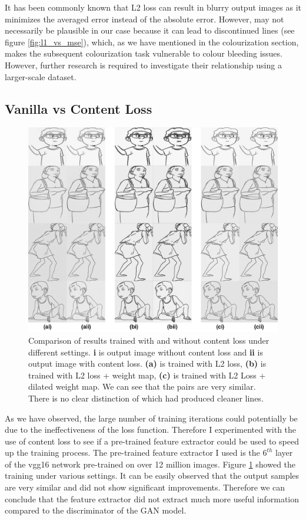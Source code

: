 It has been commonly known that L2 loss can result in blurry output images as it minimizes the averaged error instead of the absolute error\cite{isolaImagetoImageTranslationConditional2018}. However, may not necessarily be plausible in our case because it can lead to discontinued lines (see figure \ref{fig:l1_vs_mse}), which, as we have mentioned in the colourization section, makes the subsequent colourization task vulnerable to colour bleeding issues. However, further research is required to investigate their relationship using a larger-scale dataset.

\subsection{Vanilla vs Content Loss}
\begin{figure}
    \centering
    \includegraphics[width=1.0\textwidth]{images/sketch/content_loss_compare.png}
    \caption[Comparison of results trained with and without content loss under different settings.]{Comparison of results trained with and without content loss under different settings. \textbf{i} is output image without content loss and \textbf{ii} is output image with content loss. \textbf{(a)} is trained with L2 loss, \textbf{(b)} is trained with L2 loss + weight map, \textbf{(c)} is trained with L2 Loss + dilated weight map. We can see that the pairs are very similar. There is no clear distinction of which had produced cleaner lines.}
    \label{fig:content_loss_compare}
\end{figure}
As we have observed, the large number of training iterations could potentially be due to the ineffectiveness of the loss function. Therefore I experimented with the use of content loss to see if a pre-trained feature extractor could be used to speed up the training process. The pre-trained feature extractor I used is the $6^{th}$ layer of the vgg16 network pre-trained on over 12 million images. Figure \ref{fig:content_loss_compare} showed the training under various settings. It can be easily observed that the output samples are very similar and did not show significant improvements. Therefore we can conclude that the feature extractor did not extract much more useful information compared to the discriminator of the GAN model.

